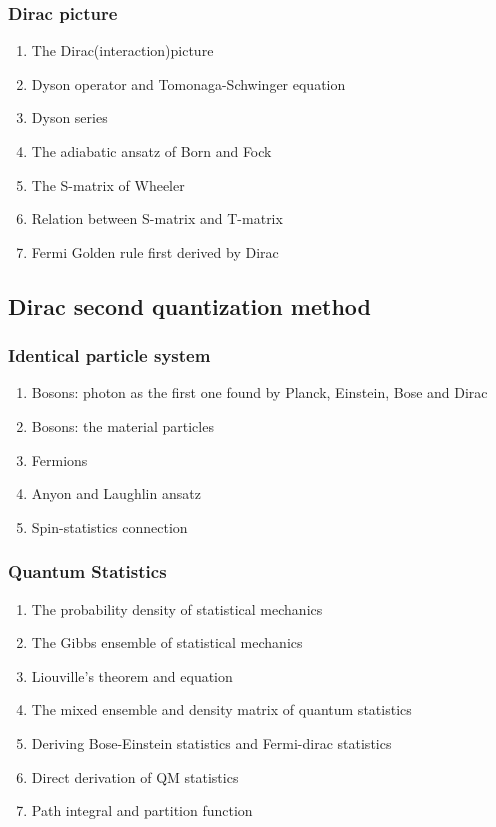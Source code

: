 \documentclass[12pt]{article}
\numberwithin{equation}{section}
\begin{document}
\subsubsection{Dirac picture}
\begin{enumerate}
\item The Dirac(interaction)picture
\item Dyson operator and Tomonaga-Schwinger equation
\item Dyson series
\item The adiabatic ansatz of Born and Fock
\item The S-matrix of Wheeler
\item Relation between S-matrix and T-matrix
\item Fermi Golden rule first derived by Dirac
\end{enumerate}
\subsection{Dirac second quantization method}
\subsubsection{Identical particle system}
\begin{enumerate}
\item Bosons: photon as the first one found by Planck, Einstein, Bose and Dirac
	
\item Bosons: the material particles
\item Fermions
\item Anyon and Laughlin ansatz
\item Spin-statistics connection
\end{enumerate}
\subsubsection{Quantum Statistics}
\begin{enumerate}
\item The probability density of statistical mechanics
\item The Gibbs ensemble of statistical mechanics
\item Liouville's theorem and equation
\item The mixed ensemble and density matrix of quantum statistics
\item Deriving Bose-Einstein statistics and Fermi-dirac statistics
\item Direct derivation of QM statistics
\item Path integral and partition function
\end{enumerate}
\end{document}

